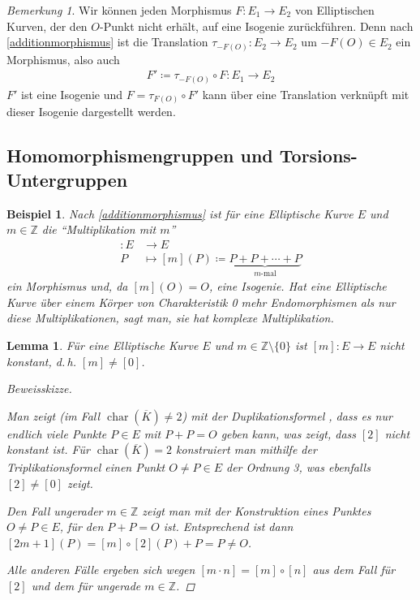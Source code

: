 \documentclass[english, german, parskip=half]{scrartcl}
\newtheorem{Lemma}[Satz]{Lemma}
\newtheorem{Beispiel}[Satz]{Beispiel}
\theoremstyle{definition}
\theoremstyle{remark}
\newtheorem{Bemerkung}[Satz]{Bemerkung}
\newcommand*{\Z}{\mathds{Z}}
\newcommand*{\algK}{\ensuremath{\overline K}} %
\newcommand*{\longto}{\longrightarrow}
\DeclareMathOperator{\Char}{char} %
\begin{document}
\begin{Bemerkung}
Wir können jeden Morphismus $F\colon E_1\to E_2$ von Elliptischen
Kurven, der den $O$-Punkt nicht erhält, auf eine Isogenie
zurückführen.
Denn nach \autoref{additionmorphismus} ist die Translation
$\tau_{-F(O)}\colon E_2\to E_2$ um $-F(O)\in E_2$
ein Morphismus, also auch 
\begin{gather*}
  F'\coloneqq\tau_{-F(O)}\circ F\colon E_1\to E_2
\end{gather*}
$F'$ ist eine Isogenie und $F=\tau_{F(O)}\circ F'$ kann über
eine Translation verknüpft mit dieser Isogenie dargestellt werden.
\end{Bemerkung}

\subsection{Homomorphismengruppen und Torsions-Untergruppen}
\begin{Beispiel}
  Nach \autoref{additionmorphismus} ist für eine Elliptische Kurve $E$
  und $m\in\Z$ die \enquote{Multiplikation mit $m$}
  \begin{align*}
    [m]\colon E &\longto E\\
    P&\longmapsto [m](P) \coloneqq
       \underbrace{P+P+\dotsb+P}_{m\text{-mal}}
  \end{align*}
  ein Morphismus und, da $[m](O)=O$, eine Isogenie.
  Hat eine Elliptische Kurve über einem Körper von Charakteristik 0
  mehr Endomorphismen als nur diese Multiplikationen, sagt man,
  sie hat komplexe Multiplikation.
\end{Beispiel}

\begin{Lemma}\label{additionnichtkonstant}
  Für eine Elliptische Kurve $E$ und $m\in\Z\setminus\{0\}$
  ist $[m]\colon E\to E$ nicht konstant, d.\,h. $[m]\neq[0]$.
  \begin{proof}[Beweisskizze]
    \cite[siehe][Proposition 4.2 (a)]{silverman}
    
    Man zeigt (im Fall $\Char(\algK)\neq2$) mit der Duplikationsformel
    \cite[Group Law Algorithm III.2.3(d)]{silverman},
    dass es nur endlich viele Punkte $P\in E$ mit $P+P=O$ geben kann,
    was zeigt, dass $[2]$ nicht konstant ist.
    Für $\Char(\algK)=2$ konstruiert man mithilfe der
    Triplikationsformel \cite[Exercise III.3.2]{silverman}
    einen Punkt $O\neq P\in E$ der Ordnung 3, was
    ebenfalls $[2]\neq[0]$ zeigt.

    Den Fall ungerader $m\in\Z$ zeigt man mit der Konstruktion eines 
    Punktes $O\neq P\in E$, für den $P+P=O$ ist. Entsprechend ist dann
    $[2m+1](P)=[m]\circ[2](P)+P=P\neq O$.
    
    Alle anderen Fälle ergeben sich wegen 
    $[m\cdot n]=[m]\circ[n]$ aus dem Fall für $[2]$ und dem für ungerade
    $m\in\Z$.
  \end{proof}
\end{Lemma}
\end{document}
